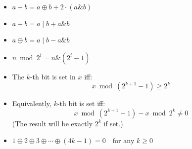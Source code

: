\begin{itemize}
    \item $a + b = a \oplus b + 2 \cdot (a \mathbin{\&} b)$
    \item $a + b = a \mid b + a \mathbin{\&} b$
    \item $a \oplus b = a \mid b - a \mathbin{\&} b$
    \item $n \bmod 2^i = n \mathbin{\&} (2^i - 1)$
    \item The $k$-th bit is set in $x$ iff:
    \[
    x \bmod (2^{k+1} - 1) \geq 2^k
    \]
    \item Equivalently, $k$-th bit is set iff:
    \[
    x \bmod (2^{k+1} - 1) - x \bmod 2^k \neq 0
    \]
    (The result will be exactly $2^k$ if set.)
    \item $1 \oplus 2 \oplus 3 \oplus \cdots \oplus (4k - 1) = 0 \quad \text{for any } k \geq 0$
\end{itemize}